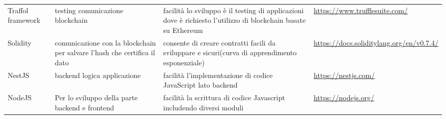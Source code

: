 \begin{longtable}{ C{1.5cm} C{3cm} C{5cm} C{3.5cm} }
    {Traffol framework} & {testing comunicazione blockchain} & {facilità lo sviluppo è il testing di applicazioni dove è richiesto l'utilizzo di blockchain basate su Ethereum} & {\url{https://www.trufflesuite.com/}}\\
    {Solidity} & {comunicazione con la blockchain per salvare l'hash che certifica il dato} & {consente di creare contratti facili da sviluppare e sicuri(curva di apprendimento esponenziale)} & {\url{https://docs.soliditylang.org/en/v0.7.4/}}\\
    {NestJS} & {backend logica applicazione} & {facilità l'implementazione di codice JavaScript lato backend} & {\url{https://nestjs.com/}}\\
    {NodeJS} & {Per lo sviluppo della parte backend e frontend} & {facilità la scrittura di codice Javascript includendo diversi moduli} & {\url{https://nodejs.org/}}\\
\end{longtable}

 
